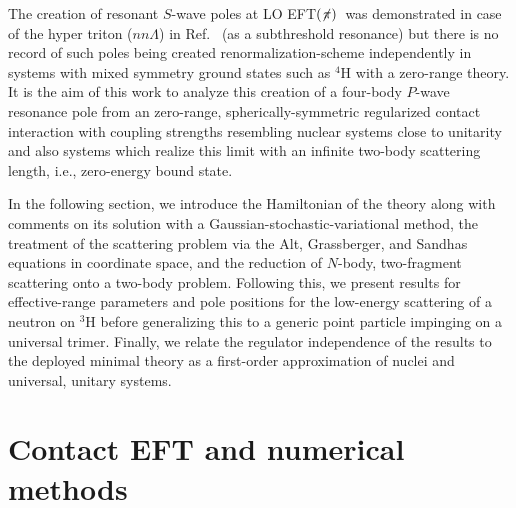 \documentclass[aps,onecolumn,preprintnumbers,amsmath,amssymb,nofootinbib,superscriptaddress,notitlepage]{revtex4-1}
\newcommand{\eftnopi}{\mbox{EFT$(\not \! \pi)$}}
\begin{document}
The creation of resonant $S$-wave poles at LO \eftnopi~was demonstrated in case of the
hyper triton ($nn\Lambda$) in Ref.~\cite{Schafer:2020rba} (as a subthreshold resonance) but
there is no record of such poles being created renormalization-scheme independently
in systems with mixed symmetry ground states
such as $^4$H with a zero-range theory. 
It is the aim of this work to analyze this creation of a four-body $P$-wave resonance
pole from an zero-range, spherically-symmetric regularized contact interaction with
coupling strengths resembling nuclear systems close to unitarity and also systems which
realize this limit with an infinite two-body scattering length, i.e., zero-energy bound
state.

In the following section, we introduce the Hamiltonian of the theory along with
comments on its solution with a Gaussian-stochastic-variational method, the
treatment of the scattering problem via the Alt, Grassberger, and Sandhas equations
in coordinate space, and the reduction of $N$-body, two-fragment scattering onto a
two-body problem.
Following this, we present results for effective-range parameters and pole positions
for the low-energy scattering of a neutron on $^3$H before generalizing this to a
generic point particle impinging on a universal trimer.
Finally, we relate the regulator independence of the results to the deployed minimal
theory as a first-order approximation of nuclei and universal, unitary systems.

\section{Contact EFT and numerical methods}
\end{document}
